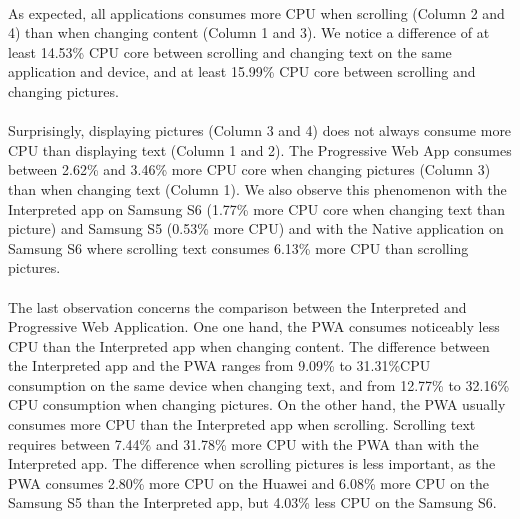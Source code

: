 \documentclass{kththesis}
\begin{document}
\paragraph{}
As expected, all applications consumes more CPU when scrolling (Column 2 and 4) than when changing content (Column 1 and 3). We notice a difference of at least 14.53\% CPU core between scrolling and changing text on the same application and device, and at least 15.99\% CPU core between scrolling and changing pictures.

\paragraph{}
Surprisingly, displaying pictures (Column 3 and 4) does not always consume more CPU than displaying text (Column 1 and 2). The Progressive Web App consumes between 2.62\% and 3.46\% more CPU core when changing pictures (Column 3) than when changing text (Column 1). We also observe this phenomenon with the Interpreted app on Samsung S6 (1.77\% more CPU core when changing text than picture) and Samsung S5 (0.53\% more CPU) and with the Native application on Samsung S6 where scrolling text consumes 6.13\% more CPU than scrolling pictures.


\paragraph{}
The last observation concerns the comparison between the Interpreted and Progressive Web Application. One one hand, the PWA consumes noticeably less CPU than the Interpreted app when changing content. The difference between the Interpreted app and the PWA ranges from 9.09\% to 31.31\%CPU consumption on the same device when changing text, and from 12.77\% to 32.16\% CPU consumption when changing pictures. On the other hand, the PWA usually consumes more CPU than the Interpreted app when scrolling. Scrolling text requires between 7.44\% and 31.78\% more CPU with the PWA than with the Interpreted app. The difference when scrolling pictures is less important, as the PWA consumes 2.80\% more CPU on the Huawei and 6.08\% more CPU on the Samsung S5 than the Interpreted app, but 4.03\% less CPU on the Samsung S6.
\end{document}
